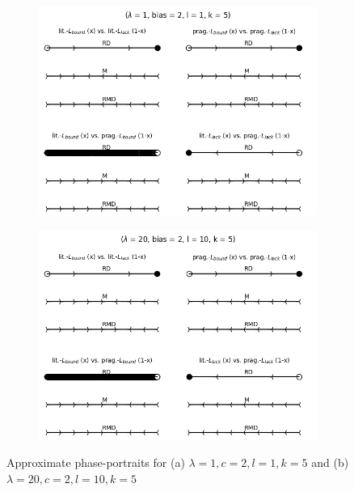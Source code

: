 \documentclass[fleqn,reqno,10pt]{article}
\begin{document}
\begin{figure}
\centering
\begin{subfigure}{.6\textwidth}
  \centering
  \includegraphics[scale=0.4]{phases-lam01-bias2-l01-k5}
  \caption{}
  \label{fig:sub1}
\end{subfigure}%
\begin{subfigure}{.6\textwidth}
  \centering
  \includegraphics[scale=0.4]{phases-lam20-bias2-l10-k5}
  \caption{}
  \label{fig:sub2}
\end{subfigure}
\caption{Approximate phase-portraits for (a) $\lambda = 1, c = 2, l = 1, k = 5$ and (b) $\lambda = 20, c = 2, l =10, k =5$}
\label{fig:phase}
\end{figure}
\end{document}
